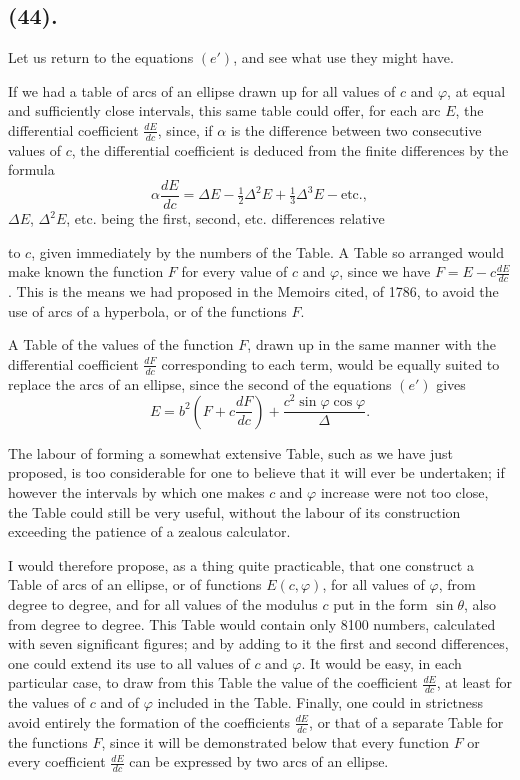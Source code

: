 \documentclass{article}
\begin{document}
\subsection*{(44).}

Let us return to the equations $(e')$, and see what use they might have.

If we had a table of arcs of an ellipse drawn up for all values of $c$ and $\varphi$, at equal and sufficiently close intervals, this same table could offer, for each arc $E$, the differential coefficient $\frac{dE}{dc}$, since, if $\alpha$ is the difference between two consecutive values of $c$, the differential coefficient is deduced from the finite differences by the formula
\[ \alpha\frac{dE}{dc}=\Delta E-\tfrac{1}{2}\Delta^{2}E+\tfrac{1}{3}\Delta^{3}E-\text{etc.}, \]
$\Delta E$, $\Delta^{2}E$, etc. being the first, second, etc. differences relative

to $c$, given immediately by the numbers of the Table. A Table so arranged would make known the function $F$ for every value of $c$ and $\varphi$, since we have $F=E-c\frac{dE}{dc}$. This is the means we had proposed in the Memoirs cited, of 1786, to avoid the use of arcs of a hyperbola, or of the functions $F$.

A Table of the values of the function $F$, drawn up in the same manner with the differential coefficient $\frac{dF}{dc}$ corresponding to each term, would be equally suited to replace the arcs of an ellipse, since the second of the equations $(e')$ gives
\[ E=b^{2}\left(F+c\frac{dF}{dc}\right)+\frac{c^{2}\sin\varphi\cos\varphi}{\Delta}. \]

The labour of forming a somewhat extensive Table, such as we have just proposed, is too considerable for one to believe that it will ever be undertaken; if however the intervals by which one makes $c$ and $\varphi$ increase were not too close, the Table could still be very useful, without the labour of its construction exceeding the patience of a zealous calculator.

I would therefore propose, as a thing quite practicable, that one construct a Table of arcs of an ellipse, or of functions $E(c,\varphi)$, for all values of $\varphi$, from degree to degree, and for all values of the modulus $c$ put in the form $\sin\theta$, also from degree to degree. This Table would contain only 8100 numbers, calculated with seven significant figures; and by adding to it the first and second differences, one could extend its use to all values of $c$ and $\varphi$. It would be easy, in each particular case, to draw from this Table the value of the coefficient $\frac{dE}{dc}$, at least for the values of $c$ and of $\varphi$ included in the Table. Finally, one could in strictness avoid entirely the formation of the coefficients $\frac{dE}{dc}$, or that of a separate Table for the functions $F$, since it will be demonstrated below that every function $F$ or every coefficient $\frac{dE}{dc}$ can be expressed by two arcs of an ellipse.
\end{document}
